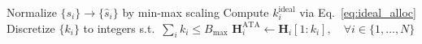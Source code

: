 
\begin{algorithm}[t]
\caption{Adaptive Token Allocation (ATA) at inference}
\label{alg:ata}
Normalize $\{s_i\}\rightarrow\{\hat{s}_i\}$ by min-max scaling\;
Compute $k_i^{\mathrm{ideal}}$ via Eq.~\eqref{eq:ideal_alloc}\;
Discretize $\{k_i\}$ to integers s.t.\ $\sum_i k_i \le B_{\max}$\;
$\mathbf{H}_i^{\mathrm{ATA}} \leftarrow \mathbf{H}_i[1{:}k_i], \quad \forall i \in \{1,\dots,N\}$\;
\;
\end{algorithm}